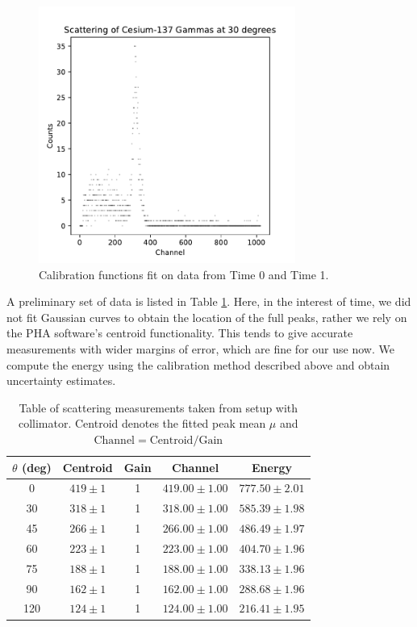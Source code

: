 \documentclass[12pt, letterpaper]{article}
\begin{document}
\begin{figure}[!h]
    \centering
    \includegraphics[width=0.75\textwidth]{experiment2/figures/scattering1-30.pdf}
    \caption{Calibration functions fit on data from Time 0 and Time 1.}
    \label{fig:gain-drift}
\end{figure}

A preliminary set of data is listed in Table \ref{table:scattering1}. Here, in the interest of time, we did not fit Gaussian curves to obtain the location of the full peaks, rather we rely on the PHA software's centroid functionality. This tends to give accurate measurements with wider margins of error, which are fine for our use now. We compute the energy using the calibration method described above and obtain uncertainty estimates. 

\begin{table}[!h]
\footnotesize
\centering
\begin{tabular}{| c | c c | c c |}
    \hline
    $\theta$ (deg) & Centroid & Gain & Channel & Energy \\
    \hline
    0 & $419 \pm 1$ & 1 & $419.00 \pm 1.00$ & $777.50 \pm 2.01$ \\
    30 & $318 \pm 1$ & 1 & $318.00 \pm 1.00$ & $585.39 \pm 1.98$ \\
    45 & $266 \pm 1$ & 1 & $266.00 \pm 1.00$ & $486.49 \pm 1.97$ \\
    60 & $223 \pm 1$ & 1 & $223.00 \pm 1.00$ & $404.70 \pm 1.96$ \\
    75 & $188 \pm 1$ & 1 & $188.00 \pm 1.00$ & $338.13 \pm 1.96$ \\
    90 & $162 \pm 1$ & 1 & $162.00 \pm 1.00$ & $288.68 \pm 1.96$ \\
    120 & $124 \pm 1$ & 1 & $124.00 \pm 1.00$ & $216.41 \pm 1.95$ \\
    \hline
\end{tabular}
\caption{Table of scattering measurements taken from setup with collimator. Centroid denotes the fitted peak mean $\mu$ and $\text{Channel}=\text{Centroid}/\text{Gain}$}
\label{table:scattering1}
\end{table}
\end{document}
